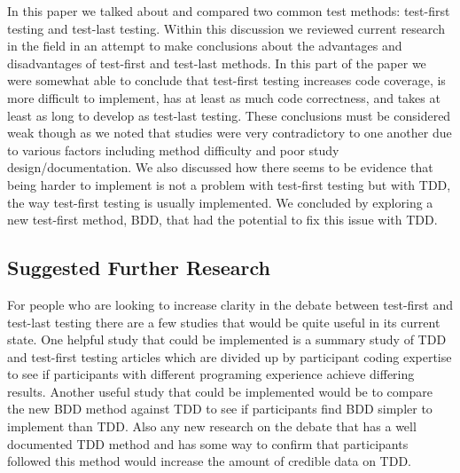 \documentclass{sig-alternate}
\begin{document}
In this paper we talked about and compared two common test methods: test-first testing and test-last testing.  Within this discussion we reviewed current research in the field in an attempt to make conclusions about the advantages and disadvantages of test-first and test-last methods.  In this part of the paper we were somewhat able to conclude that test-first testing increases code coverage, is more difficult to implement, has at least as much code correctness, and takes at least as long to develop as test-last testing.  These conclusions must be considered weak though as we noted that studies were very contradictory to one another due to various factors including method difficulty and poor study design/documentation.  We also discussed how there seems to be evidence that being harder to implement is not a problem with test-first testing but with TDD, the way test-first testing is usually implemented.  We concluded by exploring a new test-first method, BDD, that had the potential to fix this issue with TDD.

\subsection{Suggested Further Research}
For people who are looking to increase clarity in the debate between test-first and test-last testing there are a few studies that would be quite useful in its current state.  One helpful study that could be implemented is a summary study of TDD and test-first testing articles which are divided up by participant coding expertise to see if participants with different programing experience achieve differing results.  Another useful study that could be implemented would be to compare the new BDD method against TDD to see if participants find BDD simpler to implement than TDD.  Also any new research on the debate that has a well documented TDD method and has some way to confirm that participants followed this method would increase the amount of credible data on TDD.



  
\end{document}
